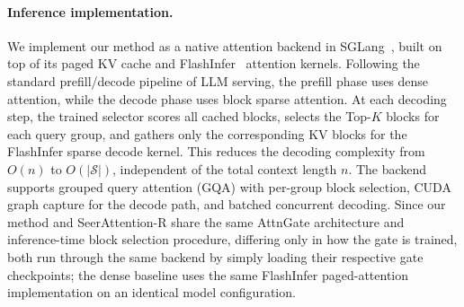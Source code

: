 \paragraph{Inference implementation.}
We implement our method as a native attention backend in SGLang~\cite{zheng2024sglang},
built on top of its paged KV cache and FlashInfer~\cite{ye2025flashinfer} attention
kernels. Following the standard prefill/decode pipeline of LLM serving, the prefill
phase uses dense attention, while the decode phase uses block sparse attention. At
each decoding step, the trained selector scores all cached blocks, selects the
Top-$K$ blocks for each query group, and gathers only the corresponding KV blocks
for the FlashInfer sparse decode kernel. This reduces the decoding complexity from
$O(n)$ to $O(|\mathcal{S}|)$, independent of the total context length $n$. The
backend supports grouped query attention (GQA) with per-group block selection,
CUDA graph capture for the decode path, and batched concurrent decoding.
Since our method and SeerAttention-R share the same
AttnGate architecture and inference-time block selection procedure, differing only
in how the gate is trained, both run through the same backend by simply loading
their respective gate checkpoints; the dense baseline uses the same FlashInfer
paged-attention implementation on an identical model configuration.


